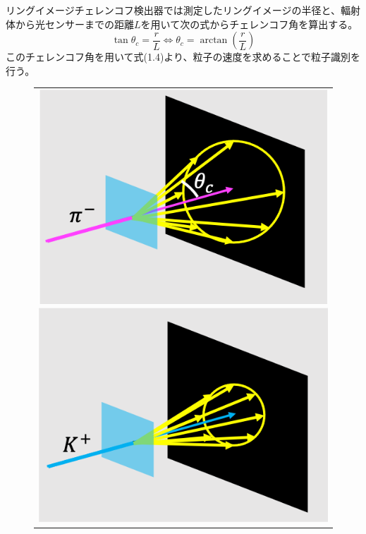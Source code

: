 \documentclass[uplatex, titlepage, dvipdfmx, 12pt, a4paper]{jsreport}
\begin{document}
リングイメージチェレンコフ検出器では測定したリングイメージの半径と、輻射体から光センサーまでの距離$L$を用いて次の式からチェレンコフ角を算出する。
\begin{equation}
\tan \theta_c = \frac{r}{L} \Leftrightarrow \theta_c = \arctan \left(\frac{r}{L}\right)
\end{equation}
このチェレンコフ角を用いて式(1.4)より、粒子の速度を求めることで粒子識別を行う。
\begin{figure}[htbp]
  \begin{center}
    \begin{tabular}{c}

      \begin{minipage}[t]{0.33\hsize}
        \begin{center}
          \includegraphics[clip, scale=0.6]{image/pion.png}
          \hspace{1.6cm}
        \end{center}
      \end{minipage}

      \begin{minipage}[t]{0.33\hsize}
        \begin{center}
          \includegraphics[clip, scale=0.6]{image/kaon.png}
          \hspace{1.6cm}
        \end{center}
      \end{minipage}


\end{tabular}
\end{center}
\end{figure}
\end{document}
